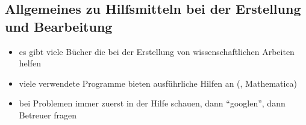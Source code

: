 \subsection*{Allgemeines zu Hilfsmitteln bei der Erstellung und Bearbeitung}
\label{sec:Allgemeines}

\begin{itemize}
  \item es gibt viele Bücher die bei der Erstellung von wissenschaftlichen Arbeiten helfen
  \item viele verwendete Programme bieten ausführliche Hilfen an (\zB \Matlab, Mathematica)
  \item bei Problemen immer zuerst in der Hilfe schauen, dann "`googlen"', dann Betreuer fragen
\end{itemize}
